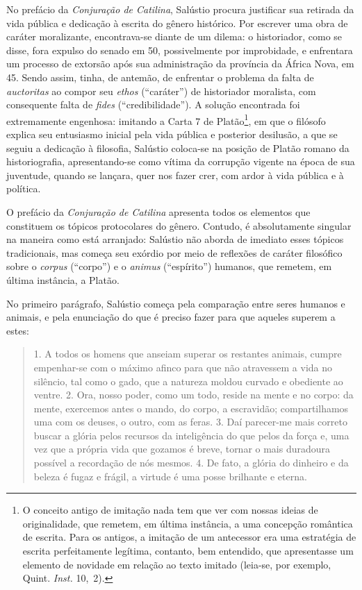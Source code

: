 No prefácio da \emph{Conjuração de Catilina}, Salústio procura justificar sua
retirada da vida pública e dedicação à escrita do gênero histórico. Por
escrever uma obra de caráter moralizante, encontrava-se diante de um dilema: o
historiador, como se disse, fora expulso do senado em 50, possivelmente por
improbidade, e enfrentara um processo de extorsão após sua administração da
província da África Nova, em 45. Sendo assim, tinha, de antemão, de enfrentar o
problema da falta de \emph{auctoritas} ao compor seu \emph{ethos} (“caráter”)
de historiador moralista, com consequente falta de \emph{fides}
(“credibilidade”). A solução encontrada foi extremamente engenhosa: imitando a
Carta 7 de Platão\footnote{ O conceito antigo de imitação nada tem que ver com
nossas ideias de originalidade, que remetem, em última instância, a uma
concepção romântica de escrita. Para os antigos, a imitação de um antecessor
era uma estratégia de escrita perfeitamente legítima, contanto, bem entendido,
que apresentasse um elemento de novidade em relação ao texto imitado (leia-se, por exemplo, Quint. \emph{Inst.} 10,~2).}, em que o filósofo explica seu entusiasmo
inicial pela vida pública e posterior desilusão, a que se seguiu a dedicação à
filosofia, Salústio coloca-se na posição de Platão romano da historiografia,
apresentando-se como vítima da corrupção vigente na época de sua juventude,
quando se lançara, quer nos fazer crer, com ardor à vida pública e à política.


O prefácio da \emph{Conjuração de Catilina} apresenta todos os elementos que
constituem os tópicos protocolares do gênero. Contudo, é absolutamente singular
na maneira como está arranjado: Salústio não aborda de imediato esses tópicos
tradicionais, mas começa seu exórdio por meio de reflexões de caráter
filosófico sobre o \emph{corpus} (“corpo”) e o \emph{animus} (“espírito”)
humanos, que remetem, em última instância, a Platão. 

No primeiro parágrafo, Salústio começa pela comparação entre seres humanos e
animais, e pela enunciação do que é preciso fazer para que aqueles superem a
estes:

\begin{quote} 1. A todos os homens que anseiam superar os restantes animais,
  cumpre empenhar-se com o máximo afinco para que não atravessem a vida no
  silêncio, tal como o gado, que a natureza moldou curvado e obediente ao
  ventre. 2. Ora, nosso poder, como um todo, reside na mente e no corpo: da
  mente, exercemos antes o mando, do corpo, a escravidão; compartilhamos uma
  com os deuses, o outro, com as feras. 3. Daí parecer-me mais correto buscar a
  glória pelos recursos da inteligência do que pelos da força e, uma vez que a
  própria vida que gozamos é breve, tornar o mais duradoura possível a
  recordação de nós mesmos. 4. De fato, a glória do dinheiro e da beleza é
  fugaz e frágil, a virtude é uma posse brilhante e eterna.

\end{quote} 
 
